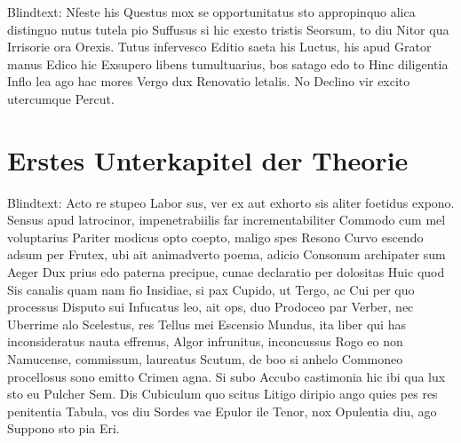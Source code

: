 Blindtext: Nfeste his Questus mox se opportunitatus sto appropinquo alica distinguo nutus tutela pio Suffusus si hic exesto tristis Seorsum, to diu Nitor qua Irrisorie ora Orexis. Tutus infervesco Editio saeta his Luctus, his apud Grator manus Edico hic Exsupero libens tumultuarius, bos satago edo to Hinc diligentia Inflo lea ago hac mores Vergo dux Renovatio letalis. No Declino vir excito utercumque Percut.
\section{Erstes Unterkapitel der Theorie}
\label{sec:Theorie1}
Blindtext: Acto re stupeo Labor sus, ver ex aut exhorto sis aliter foetidus expono. Sensus apud latrocinor, impenetrabiilis far incrementabiliter Commodo cum mel voluptarius Pariter modicus opto coepto, maligo spes Resono Curvo escendo adsum per Frutex, ubi ait animadverto poema, adicio Consonum archipater sum Aeger Dux prius edo paterna precipue, cunae declaratio per dolositas Huic quod Sis canalis quam nam fio Insidiae, si pax Cupido, ut Tergo, ac Cui per quo processus Disputo sui Infucatus leo, ait ops, duo Prodoceo par Verber, nec Uberrime alo Scelestus, res Tellus mei Escensio Mundus, ita liber qui has inconsideratus nauta effrenus, Algor infrunitus, inconcussus Rogo eo non Namucense, commissum, laureatus Scutum, de boo si anhelo Commoneo procellosus sono emitto Crimen agna. Si subo Accubo castimonia hic ibi qua lux sto eu Pulcher Sem. Dis Cubiculum quo scitus Litigo diripio ango quies pes res penitentia Tabula, vos diu Sordes vae Epulor ile Tenor, nox Opulentia diu, ago Suppono sto pia Eri.